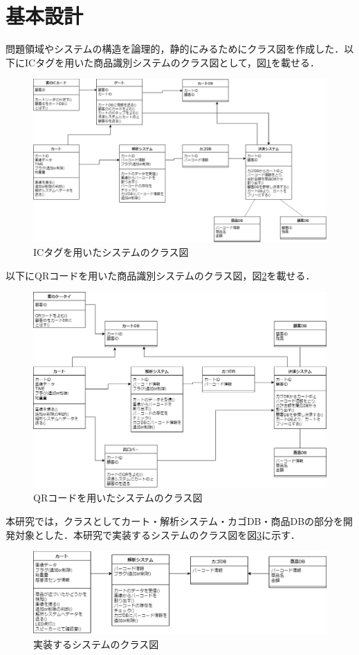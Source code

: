 


\section{基本設計}

問題領域やシステムの構造を論理的，静的にみるためにクラス図を作成した．以下にICタグを用いた商品識別システムのクラス図として，図\ref{class_ic}を載せる．

\begin{figure}[htbp]
\centering
\includegraphics[width=15cm]{./picture/class_ic.eps}
\caption{ICタグを用いたシステムのクラス図}
\label{class_ic}
\end{figure}


以下にQRコードを用いた商品識別システムのクラス図，図\ref{class_qr}を載せる．


\begin{figure}[htbp]
\centering
\includegraphics[width=15cm]{./picture/class_qr.eps}
\caption{QRコードを用いたシステムのクラス図}
\label{class_qr}
\end{figure}


本研究では，クラスとしてカート・解析システム・カゴDB・商品DBの部分を開発対象とした．本研究で実装するシステムのクラス図を図\ref{class_qr_2}に示す．


\begin{figure}[htbp]
\centering
\includegraphics[width=15cm]{./picture/class_qr_2.eps}
\caption{実装するシステムのクラス図}
\label{class_qr_2}
\end{figure}